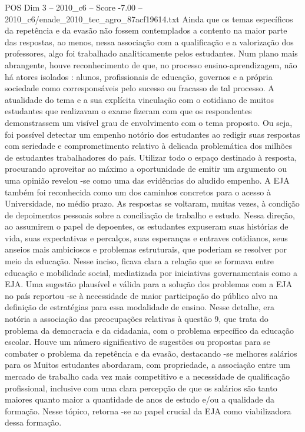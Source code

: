 \begin{textsample}{POS Dim 3 – 2010\_c6 – Score -7.00 – 2010\_c6/enade\_2010\_tec\_agro\_87acf19614.txt}
Ainda que os temas específicos da repetência e da evasão não fossem contemplados a contento na maior parte das respostas, ao menos, nessa associação com a qualificação e a valorização dos professores, algo foi trabalhado analiticamente pelos estudantes.
Num plano mais abrangente, houve reconhecimento de que, no processo ensino-aprendizagem, não há atores isolados : alunos, profissionais de educação, governos e a própria sociedade como corresponsáveis pelo sucesso ou fracasso de tal processo.
A atualidade do tema e a sua explícita vinculação com o cotidiano de muitos estudantes que realizavam o exame fizeram com que os respondentes demonstrassem um visível grau de envolvimento com o tema proposto.
Ou seja, foi possível detectar um empenho notório dos estudantes ao redigir suas respostas com seriedade e comprometimento relativo à delicada problemática dos milhões de estudantes trabalhadores do país.
Utilizar todo o espaço destinado à resposta, procurando aproveitar ao máximo a oportunidade de emitir um argumento ou uma opinião revelou -se como uma das evidências do aludido empenho.
A EJA também foi reconhecida como um dos caminhos concretos para o acesso à Universidade, no médio prazo.
As respostas se voltaram, muitas vezes, à condição de depoimentos pessoais sobre a conciliação de trabalho e estudo.
Nessa direção, ao assumirem o papel de depoentes, os estudantes expuseram suas histórias de vida, suas expectativas e percalços, suas esperanças e entraves cotidianos, seus anseios mais ambiciosos e problemas estruturais, que poderiam se resolver por meio da educação.
Nesse inciso, ficava clara a relação que se formava entre educação e mobilidade social, mediatizada por iniciativas governamentais como a EJA.
Uma sugestão plausível e válida para a solução dos problemas com a EJA no país reportou -se à necessidade de maior participação do público alvo na definição de estratégias para essa modalidade de ensino.
Nesse detalhe, era notória a associação das preocupações relativas à questão 9, que trata do problema da democracia e da cidadania, com o problema específico da educação escolar.
Houve um número significativo de sugestões ou propostas para se combater o problema da repetência e da evasão, destacando -se melhores salários para os Muitos estudantes abordaram, com propriedade, a associação entre um mercado de trabalho cada vez mais competitivo e a necessidade de qualificação profissional, inclusive com uma clara percepção de que os salários são tanto maiores quanto maior a quantidade de anos de estudo e/ou a qualidade da formação.
Nesse tópico, retorna -se ao papel crucial da EJA como viabilizadora dessa formação.

\end{textsample}
